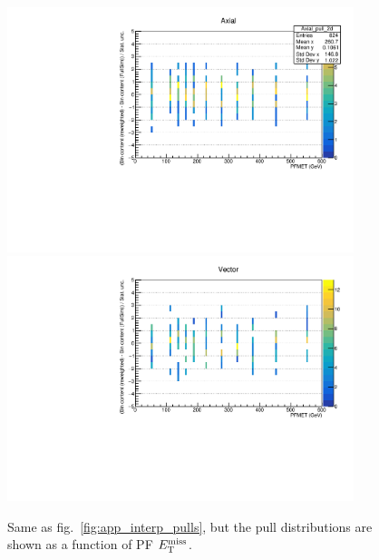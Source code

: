  \begin{figure}[htbp]
   \begin{center}
	\includegraphics[width=0.9\textwidth]{figures/interpolation_appendix/Axial_pulls_2d.pdf}
	\includegraphics[width=0.9\textwidth]{figures/interpolation_appendix/Vector_pulls_2d.pdf}
     \caption{Same as fig.~\ref{fig:app_interp_pulls}, but the pull distributions are shown as a function of PF $E_\mathrm{T}^{\mathrm{miss}}$.}
     \label{fig:app_interp_pulls_2d}
   \end{center}
 \end{figure}

